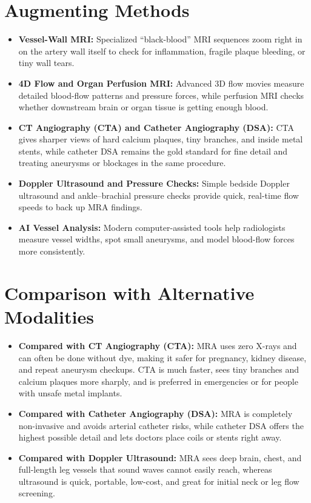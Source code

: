 \section{Augmenting Methods}
\begin{itemize}
\item \textbf{Vessel-Wall MRI:} Specialized ``black-blood'' MRI sequences zoom right in on the artery wall itself to check for inflammation, fragile plaque bleeding, or tiny wall tears.
\item \textbf{4D Flow and Organ Perfusion MRI:} Advanced 3D flow movies measure detailed blood-flow patterns and pressure forces, while perfusion MRI checks whether downstream brain or organ tissue is getting enough blood.
\item \textbf{CT Angiography (CTA) and Catheter Angiography (DSA):} CTA gives sharper views of hard calcium plaques, tiny branches, and inside metal stents, while catheter DSA remains the gold standard for fine detail and treating aneurysms or blockages in the same procedure.
\item \textbf{Doppler Ultrasound and Pressure Checks:} Simple bedside Doppler ultrasound and ankle--brachial pressure checks provide quick, real-time flow speeds to back up MRA findings.
\item \textbf{AI Vessel Analysis:} Modern computer-assisted tools help radiologists measure vessel widths, spot small aneurysms, and model blood-flow forces more consistently.
\end{itemize}

\section{Comparison with Alternative Modalities}
\begin{itemize}
\item \textbf{Compared with CT Angiography (CTA):} MRA uses zero X-rays and can often be done without dye, making it safer for pregnancy, kidney disease, and repeat aneurysm checkups. CTA is much faster, sees tiny branches and calcium plaques more sharply, and is preferred in emergencies or for people with unsafe metal implants.
\item \textbf{Compared with Catheter Angiography (DSA):} MRA is completely non-invasive and avoids arterial catheter risks, while catheter DSA offers the highest possible detail and lets doctors place coils or stents right away.
\item \textbf{Compared with Doppler Ultrasound:} MRA sees deep brain, chest, and full-length leg vessels that sound waves cannot easily reach, whereas ultrasound is quick, portable, low-cost, and great for initial neck or leg flow screening.
\end{itemize}

